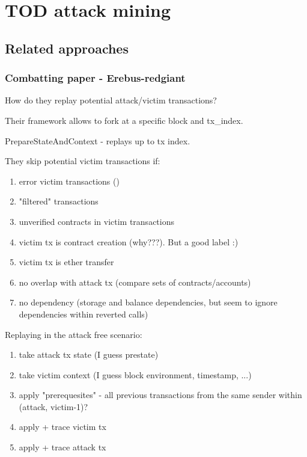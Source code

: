 \documentclass[draft,final]{vutinfth} %
\begin{document}
\chapter{TOD attack mining}



\section{Related approaches}

\subsection{Combatting paper - Erebus-redgiant}

How do they replay potential attack/victim transactions?

Their framework allows to fork at a specific block and tx\_index.

PrepareStateAndContext - replays up to tx index.


They skip potential victim transactions if:

\begin{enumerate}
    \item error victim transactions ()
    \item "filtered" transactions 
    \item unverified contracts in victim transactions
    \item victim tx is contract creation (why???). But a good label :)
    \item victim tx is ether transfer
    \item no overlap with attack tx (compare sets of contracts/accounts)
    \item no dependency (storage and balance dependencies, but seem to ignore dependencies within reverted calls)
\end{enumerate}

Replaying in the attack free scenario:

\begin{enumerate}
    \item take attack tx state (I guess prestate)
    \item take victim context (I guess block environment, timestamp, ...)
    \item apply "prerequesites" - all previous transactions from the same sender within (attack, victim-1)?
    \item apply + trace victim tx
    \item apply + trace attack tx
\end{enumerate}
\end{document}
